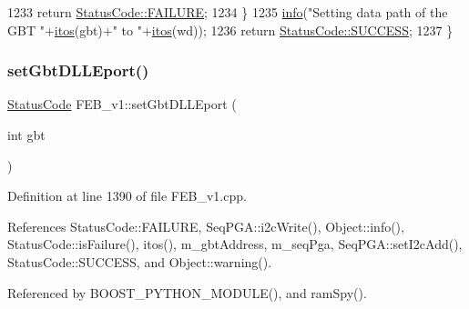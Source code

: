 \begin{DoxyCode}
1233     \textcolor{keywordflow}{return} \hyperlink{classStatusCode_a6f565cbeadc76d14c72f047e5e85eb4ba3da73d4c469762eb9d3c960368252b26}{StatusCode::FAILURE};
1234   \}
1235   \hyperlink{classObject_a644fd329ea4cb85f54fa6846484b84a8}{info}(\textcolor{stringliteral}{"Setting data path of the GBT "}+\hyperlink{Tools_8h_af330027dbdafb9a30768b3613c553e60}{itos}(gbt)+\textcolor{stringliteral}{" to "}+\hyperlink{Tools_8h_af330027dbdafb9a30768b3613c553e60}{itos}(wd));
1236   \textcolor{keywordflow}{return} \hyperlink{classStatusCode_a6f565cbeadc76d14c72f047e5e85eb4badd0da38d3ba0d922efd1f4619bc37ad8}{StatusCode::SUCCESS};
1237 \}
\end{DoxyCode}
\mbox{\label{classFEB__v1_a66584fe850cdf9e4ccd03fd4b2f4db38}} 
\subsubsection{\texorpdfstring{set\+Gbt\+D\+L\+L\+Eport()}{setGbtDLLEport()}}
{\footnotesize\ttfamily \hyperlink{classStatusCode}{Status\+Code} F\+E\+B\+\_\+v1\+::set\+Gbt\+D\+L\+L\+Eport (\begin{DoxyParamCaption}\item[{int}]{gbt }\end{DoxyParamCaption})}



Definition at line 1390 of file F\+E\+B\+\_\+v1.\+cpp.



References Status\+Code\+::\+F\+A\+I\+L\+U\+RE, Seq\+P\+G\+A\+::i2c\+Write(), Object\+::info(), Status\+Code\+::is\+Failure(), itos(), m\+\_\+gbt\+Address, m\+\_\+seq\+Pga, Seq\+P\+G\+A\+::set\+I2c\+Add(), Status\+Code\+::\+S\+U\+C\+C\+E\+SS, and Object\+::warning().



Referenced by B\+O\+O\+S\+T\+\_\+\+P\+Y\+T\+H\+O\+N\+\_\+\+M\+O\+D\+U\+L\+E(), and ram\+Spy().


